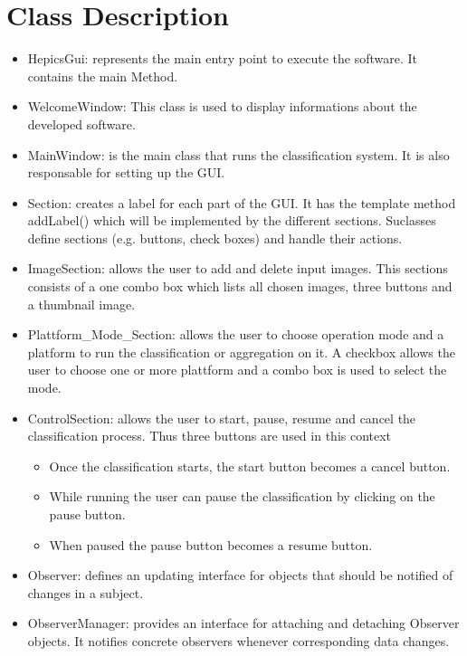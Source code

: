 \documentclass[parskip=full]{scrartcl}
\begin{document}
\pagebreak

\section {Class Description}

\begin{itemize}
	\item HepicsGui: represents the main entry point to execute the software. It contains the main Method.
	\item WelcomeWindow: This class is used to display informations about the developed software.
	\item MainWindow: is the main class that runs the classification system. It is also responsable for setting up the GUI.
	\item Section: creates a label for each part of the GUI. It has the template method addLabel() which will be implemented by the different sections. Suclasses define sections (e.g. buttons, check boxes) and handle their actions.
	\item ImageSection: allows the user to add and delete input images. This sections consists of a one combo box which lists all chosen images, three buttons and a thumbnail image.
	\item Plattform\_Mode\_Section: allows the user to choose operation mode and a platform to run the classification or aggregation on it. A checkbox allows the user to choose one or more plattform and a combo box is used to select the mode.
	\item ControlSection: allows the user to start, pause, resume and cancel the classification process. Thus three buttons are used in this context
	\begin{itemize}
		\item Once the classification starts, the start button becomes a cancel button. 
		\item While running the user can pause the classification by clicking on the pause button. 
		\item When paused the pause button becomes a resume button.
	\end{itemize}
	\item Observer: defines an updating interface for objects that should be notified of changes in a subject.
	\item ObserverManager: provides an interface for attaching and detaching Observer objects. It notifies concrete observers whenever corresponding data changes.
\end{itemize}
\end{document}
